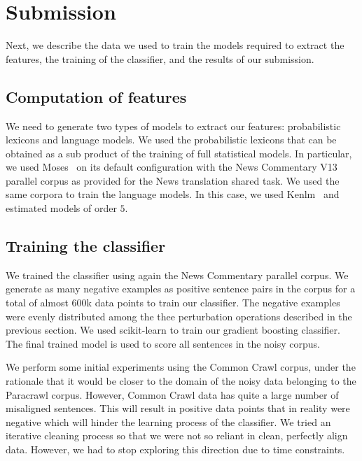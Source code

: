 \section{Submission}
\label{sec:results}

Next, we describe the data we used to train the models required to extract the features, the training of the classifier, and the results of our submission.

\subsection{Computation of features}

We need to generate two types of models to extract our features: probabilistic lexicons and language models. We used the probabilistic lexicons that can be obtained as a sub product of the training of full statistical models. In particular, we used Moses~\cite{Moses} on its default configuration with the News Commentary V13 parallel corpus as provided for the News translation shared task. We used the same corpora to train the language models. In this case, we used Kenlm~\cite{Kenlm} and estimated models of order $5$.


\subsection{Training the classifier}

We trained the classifier using again the News Commentary parallel corpus. We generate as many negative examples as positive sentence pairs in the corpus for a total of almost $600$k data points to train our classifier. The negative examples were evenly distributed among the thee perturbation operations described in the previous section. We used scikit-learn to train our gradient boosting classifier. The final trained model is used to score all sentences in the noisy corpus.

We perform some initial experiments using the Common Crawl corpus, under the rationale that it would be closer to the domain of the noisy data belonging to the Paracrawl corpus. However, Common Crawl data has quite a large number of misaligned sentences. This will result in positive data points that in reality were negative which will hinder the learning process of the classifier. We tried an iterative cleaning process so that we were not so reliant in clean, perfectly align data. However, we had to stop exploring this direction due to time constraints.


